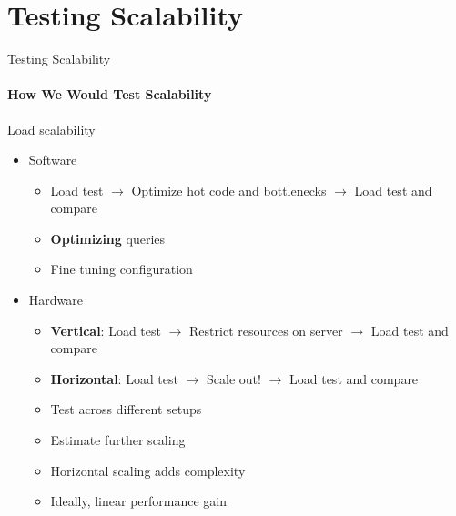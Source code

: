 \section{Testing Scalability}

\begin{frame}{Testing Scalability}
        \framesubtitle{How We Would Test Scalability}
        Load scalability
        \begin{itemize}
            \item<1-> Software
                \begin{itemize}
                    \item Load test $\rightarrow$ Optimize hot code and bottlenecks $\rightarrow$ Load test and compare
                    \item \textbf{Optimizing} queries
                    \item Fine tuning configuration
                \end{itemize}
            \item<2-> Hardware
                \begin{itemize}
                    \item \textbf{Vertical}: Load test $\rightarrow$ Restrict resources on server $\rightarrow$ Load test and compare
                    \item \textbf{Horizontal}: Load test $\rightarrow$ Scale out! $\rightarrow$ Load test and compare
                    \item Test across different setups
                    \item Estimate further scaling
                    \item Horizontal scaling adds complexity
                    \item Ideally, linear performance gain
                \end{itemize}
        \end{itemize}
\end{frame}

